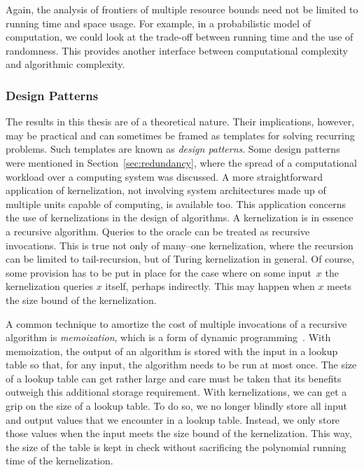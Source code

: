Again, the analysis of frontiers of multiple resource bounds need not be limited to running time and space usage.
For example, in a probabilistic model of computation, we could look at the trade-off between running time and the use of randomness.
This provides another interface between computational complexity and algorithmic complexity.

\subsubsection{Design Patterns}
The results in this thesis are of a theoretical nature.
Their implications, however, may be practical and can sometimes be framed as templates for solving recurring problems.
Such templates are known as \emph{design patterns}.
Some design patterns were mentioned in Section~\ref{sec:redundancy}, where the spread of a computational workload over a computing system was discussed.
A more straightforward application of kernelization, not involving system architectures made up of multiple units capable of computing, is available too.
This application concerns the use of kernelizations in the design of algorithms.
A kernelization is in essence a recursive algorithm.
Queries to the oracle can be treated as recursive invocations.
This is true not only of many--one kernelization, where the recursion can be limited to tail-recursion, but of Turing kernelization in general.
Of course, some provision has to be put in place for the case where on some input~$x$ the kernelization queries $x$ itself, perhaps indirectly.
This may happen when $x$ meets the size bound of the kernelization.

A common technique to amortize the cost of multiple invocations of a recursive algorithm is \emph{memoization}, which is a form of dynamic programming~\parencite[see][Chapter~16]{cormen2009introduction}.
With memoization, the output of an algorithm is stored with the input in a lookup table so that, for any input, the algorithm needs to be run at most once.
The size of a lookup table can get rather large and care must be taken that its benefits outweigh this additional storage requirement.
With kernelizations, we can get a grip on the size of a lookup table.
To do so, we no longer blindly store all input and output values that we encounter in a lookup table.
Instead, we only store those values when the input meets the size bound of the kernelization.
This way, the size of the table is kept in check without sacrificing the polynomial running time of the kernelization.

